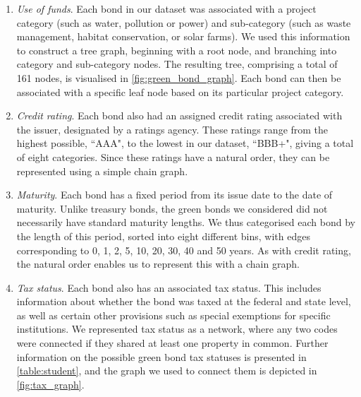 \begin{enumerate}
    \item \textit{Use of funds}. Each bond in our dataset was associated with a project category (such as water, pollution or power) and sub-category (such as waste management, habitat conservation, or solar farms). We used this information to construct a tree graph, beginning with a root node, and branching into category and sub-category nodes. The resulting tree, comprising a total of 161 nodes, is visualised in \cref{fig:green_bond_graph}. Each bond can then be associated with a specific leaf node based on its particular project category.
    \item \textit{Credit rating}. Each bond also had an assigned credit rating associated with the issuer, designated by a ratings agency. These ratings range from the highest possible, ``AAA", to the lowest in our dataset, ``BBB+", giving a total of eight categories. Since these ratings have a natural order, they can be represented using a simple chain graph.
    \item \textit{Maturity}. Each bond has a fixed period from its issue date to the date of maturity. Unlike treasury bonds, the green bonds we considered did not necessarily have standard maturity lengths. We thus categorised each bond by the length of this period, sorted into eight different bins, with edges corresponding to 0, 1, 2, 5, 10, 20, 30, 40 and 50 years. As with credit rating, the natural order enables us to represent this with a chain graph.
    \item \textit{Tax status}. Each bond also has an associated tax status. This includes information about whether the bond was taxed at the federal and state level, as well as certain other provisions such as special exemptions for specific institutions. We represented tax status as a network, where any two codes were connected if they shared at least one property in common. Further information on the possible green bond tax statuses is presented in \cref{table:student}, and the graph we used to connect them is depicted in \cref{fig:tax_graph}.
    \end{enumerate}

